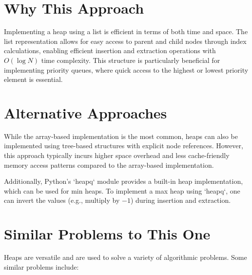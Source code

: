 \section*{Why This Approach}

Implementing a heap using a list is efficient in terms of both time and space. The list representation allows for easy access to parent and child nodes through index calculations, enabling efficient insertion and extraction operations with \( O(\log N) \) time complexity. This structure is particularly beneficial for implementing priority queues, where quick access to the highest or lowest priority element is essential.

\section*{Alternative Approaches}

While the array-based implementation is the most common, heaps can also be implemented using tree-based structures with explicit node references. However, this approach typically incurs higher space overhead and less cache-friendly memory access patterns compared to the array-based implementation.

Additionally, Python's `heapq` module provides a built-in heap implementation, which can be used for min heaps. To implement a max heap using `heapq`, one can invert the values (e.g., multiply by \(-1\)) during insertion and extraction.

\section*{Similar Problems to This One}

Heaps are versatile and are used to solve a variety of algorithmic problems. Some similar problems include:

